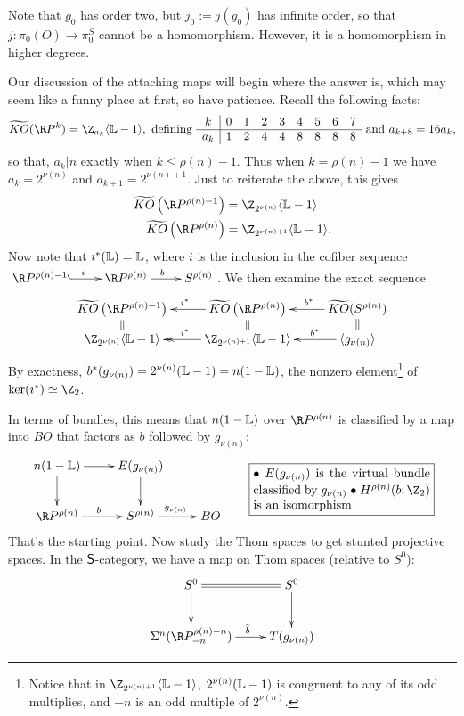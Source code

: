 Note that $g_0$ has order two, but $j_0:=j(g_0)$ has infinite order, so that $j:\pi_0(O)\to\pi^S_0$ cannot be a homomorphism. However, it is a homomorphism in higher degrees.

Our discussion of the attaching maps will begin where the answer is, which may seem like a funny place at first, so have patience.  Recall the following facts:
\[\widetilde{KO}(\RP^k)=\Z_{a_k}\langle \bundle L-1\rangle,\text{ defining }\begin{array}{c|cccccccc}
k&0&1&2&3&4&5&6&7\\\hline
a_k&1&2&4&4&8&8&8&8
\end{array}\text{ and }a_{k+8}=16a_k,\]
so that, $a_k|n$ exactly when $k\leq\rho(n)-1$. Thus when $k = \rho(n) - 1$ we have $a_k=2^{\nu(n)}$ and $a_{k+1}=2^{\nu(n)+1}$. Just to reiterate the above, this gives
\begin{align*}
\widetilde{KO} \left( \RP^{\rho(n) - 1} \right) & = \Z_{2^{\nu(n)}} \langle \bundle L - 1 \rangle \\
\widetilde{KO} \left( \RP^{\rho(n)} \right) & = \Z_{2^{\nu(n) + 1}} \langle \bundle L - 1 \rangle.
\end{align*}
Now note that $\imath^*(\mathbb{L})=\mathbb{L}$, where $i$ is the inclusion in the cofiber sequence
$\xymatrix{
\RP^{\rho(n) - 1} \ar@{^{(}->}[r]^\imath& \RP^{\rho(n)} \ar[r]^b& S^{\rho(n)}
}$.
We then examine the exact sequence
\[\xymatrix@R=.2cm{
\widetilde{KO} \left( \RP^{\rho(n) - 1} \right)&\ar[l]_{\imath^*}\widetilde{KO} \left( \RP^{\rho(n)} \right)&\ar[l]_{\ \ \ b^*}\widetilde{KO} (S^{\rho(n)})\\
\Z_{2^{\nu(n)}} \langle \bundle L - 1 \rangle\ar@{=}[u]&\ar@{->>}[l]_{\imath^*}\Z_{2^{\nu(n) + 1}} \langle \bundle L - 1 \rangle\ar@{=}[u]&\ar[l]_{\qquad b^*}\langle g_{\nu(n)}\rangle\ar@{=}[u].
}\]
By exactness, $b^*(g_{\nu(n)})=2^{\nu(n)}(\mathbb{L} - 1)=n(1-\mathbb{L})$, the nonzero element\footnote{Notice that in $\Z_{2^{\nu(n) + 1}} \langle \bundle L - 1\rangle$, $2^{\nu(n)}(\mathbb{L} - 1)$ is congruent to any of its odd multiplies, and $-n$ is an odd multiple of $2^{\nu(n)}$.} of $\ker(\imath^*)\simeq\Z_2$.

  In terms of bundles, this means that $n(1-\mathbb{L})$ over $\RP^{\rho(n)}$ is classified by a map into $BO$ that factors as $b$ followed by $g_{\nu(n)}$:
\[\xymatrix{
\ar[d]n(1-\bundle L) \ar[r] & E(g_{\nu(n)})\ar[d] \\
\RP^{\rho(n)}\ar[r]^b & S^{\rho(n)} \ar[r]^{g_{\nu(n)}} & BO
}\qquad\fbox{\raisebox{-.65cm}{\begin{minipage}{5cm}
\Bullet $E(g_{\nu(n)})$ is the virtual bundle classified by $g_{\nu(n)}$

\Bullet $H^{\rho(n)}(b;\Z_2)$ is an isomorphism
\end{minipage}}}\]
That's the starting point.  Now study the Thom spaces to get stunted projective spaces.  In the $\mathsf{S}$-category, we have a map on Thom spaces (relative to $S^0$):
\[\xymatrix{S^0\ar[d]\ar@{=}[r]&S^0\ar[d]\\
\Suspend^n(\RP^{\rho(n)-n}_{-n}) \ar[r]^{\ \ \ \widetilde b}& T(g_{\nu(n)})
}\]

